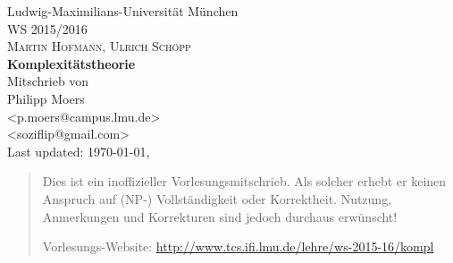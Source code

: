 \documentclass[12pt, oneside, a4paper, numbers=enddot, abstracton, parskip=full]{scrreprt}
\begin{document}

\begin{titlepage}
    \begin{center}
        \Large{Ludwig-Maximilians-Universität München}\\[1cm]
        \large{\scshape{WS 2015/2016}}\\
        \large{\scshape{Martin Hofmann, Ulrich Schöpp}}\\[3cm]
        \Huge{\textbf{Komplexitätstheorie}}\\[6cm]
        \large{Mitschrieb von}\\[1cm]
        \large{Philipp Moers \\ 
        <p.moers@campus.lmu.de>\\
        <soziflip@gmail.com>}\\[3cm]
        \vfill
        \footnotesize{Last updated: \today, \currenttime}
    \end{center}
\end{titlepage}

\begin{abstract}
    Dies ist ein inoffizieller Vorlesungsmitschrieb. Als solcher erhebt er keinen Anspruch auf (NP-) Vollständigkeit oder Korrektheit. Nutzung, Anmerkungen und Korrekturen sind jedoch durchaus erwünscht! 

    Vorlesungs-Website: \url{http://www.tcs.ifi.lmu.de/lehre/ws-2015-16/kompl}
\end{abstract}


\tableofcontents


\newpage



% 
% 
% 
% 
% 
\end{document}
